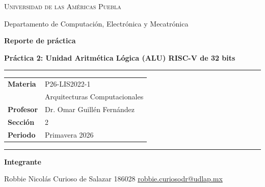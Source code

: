 \documentclass[12pt,letterpaper]{article}
\begin{document}
\begin{titlepage}
\thispagestyle{empty}
\begin{center}
\vspace*{0.8cm}

{\Large \textsc{Universidad de las Américas Puebla}}\par
{\small Departamento de Computación, Electrónica y Mecatrónica}\par

\vspace{1.2cm}

{\Huge \textbf{Reporte de práctica}}\par
\vspace{0.15cm}
{\Large \textbf{Práctica 2: Unidad Aritmética Lógica (ALU) RISC-V de 32 bits}}\par

\vspace{1.0cm}

\begin{minipage}{0.92\textwidth}
\rule{\textwidth}{0.8pt}\par
\vspace{0.35cm}

\begin{tabular}{@{}L{0.30\textwidth}L{0.62\textwidth}@{}}
\textbf{Materia} & P26-LIS2022-1\\
& Arquitecturas Computacionales\\
\textbf{Profesor} & Dr. Omar Guillén Fernández\\
\textbf{Sección} & 2\\
\textbf{Periodo} & Primavera 2026\\
\end{tabular}

\vspace{0.35cm}
\rule{\textwidth}{0.8pt}
\end{minipage}

\vfill

\begin{minipage}{0.92\textwidth}
\textbf{Integrante}\par
\vspace{0.25cm}
Robbie Nicolás Curioso de Salazar \hfill 186028 \hfill \href{mailto:robbie.curiosodr@udlap.mx}{robbie.curiosodr@udlap.mx}\par
\end{minipage}

\vspace{0.6cm}


\end{center}
\end{titlepage}
\end{document}
